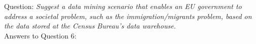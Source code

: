 Question:
\emph{
    Suggest a data mining scenario that enables an EU government to address a societal
problem, such as the immigration/migrants problem, based on the data stored at the
Census Bureau’s data warehouse.
}\\

Answers to Question 6:

